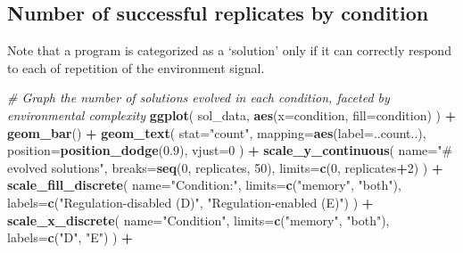\documentclass[
]{book}
\newenvironment{Shaded}{\begin{snugshade}}{\end{snugshade}}
\newcommand{\CommentTok}[1]{\textcolor[rgb]{0.56,0.35,0.01}{\textit{#1}}}
\newcommand{\DataTypeTok}[1]{\textcolor[rgb]{0.13,0.29,0.53}{#1}}
\newcommand{\DecValTok}[1]{\textcolor[rgb]{0.00,0.00,0.81}{#1}}
\newcommand{\FloatTok}[1]{\textcolor[rgb]{0.00,0.00,0.81}{#1}}
\newcommand{\KeywordTok}[1]{\textcolor[rgb]{0.13,0.29,0.53}{\textbf{#1}}}
\newcommand{\NormalTok}[1]{#1}
\newcommand{\OperatorTok}[1]{\textcolor[rgb]{0.81,0.36,0.00}{\textbf{#1}}}
\newcommand{\StringTok}[1]{\textcolor[rgb]{0.31,0.60,0.02}{#1}}
\begin{document}
\hypertarget{number-of-successful-replicates-by-condition}{%
\subsection{Number of successful replicates by condition}\label{number-of-successful-replicates-by-condition}}

Note that a program is categorized as a `solution' only if it can correctly respond to each of repetition of the environment signal.

\begin{Shaded}
\begin{Highlighting}[]
\CommentTok{\# Graph the number of solutions evolved in each condition, faceted by environmental complexity}
\KeywordTok{ggplot}\NormalTok{( sol\_data, }\KeywordTok{aes}\NormalTok{(}\DataTypeTok{x=}\NormalTok{condition, }\DataTypeTok{fill=}\NormalTok{condition) ) }\OperatorTok{+}
\StringTok{  }\KeywordTok{geom\_bar}\NormalTok{() }\OperatorTok{+}
\StringTok{  }\KeywordTok{geom\_text}\NormalTok{(}
    \DataTypeTok{stat=}\StringTok{"count"}\NormalTok{,}
    \DataTypeTok{mapping=}\KeywordTok{aes}\NormalTok{(}\DataTypeTok{label=}\NormalTok{..count..),}
    \DataTypeTok{position=}\KeywordTok{position\_dodge}\NormalTok{(}\FloatTok{0.9}\NormalTok{),}
    \DataTypeTok{vjust=}\DecValTok{0}
\NormalTok{  ) }\OperatorTok{+}
\StringTok{  }\KeywordTok{scale\_y\_continuous}\NormalTok{(}
    \DataTypeTok{name=}\StringTok{"\# evolved solutions"}\NormalTok{,}
    \DataTypeTok{breaks=}\KeywordTok{seq}\NormalTok{(}\DecValTok{0}\NormalTok{, replicates, }\DecValTok{50}\NormalTok{),}
    \DataTypeTok{limits=}\KeywordTok{c}\NormalTok{(}\DecValTok{0}\NormalTok{, replicates}\OperatorTok{+}\DecValTok{2}\NormalTok{)}
\NormalTok{  ) }\OperatorTok{+}
\StringTok{  }\KeywordTok{scale\_fill\_discrete}\NormalTok{(}
    \DataTypeTok{name=}\StringTok{"Condition:"}\NormalTok{,}
    \DataTypeTok{limits=}\KeywordTok{c}\NormalTok{(}\StringTok{"memory"}\NormalTok{, }\StringTok{"both"}\NormalTok{),}
    \DataTypeTok{labels=}\KeywordTok{c}\NormalTok{(}\StringTok{"Regulation{-}disabled (D)"}\NormalTok{, }\StringTok{"Regulation{-}enabled (E)"}\NormalTok{)}
\NormalTok{  ) }\OperatorTok{+}
\StringTok{  }\KeywordTok{scale\_x\_discrete}\NormalTok{(}
    \DataTypeTok{name=}\StringTok{"Condition"}\NormalTok{,}
    \DataTypeTok{limits=}\KeywordTok{c}\NormalTok{(}\StringTok{"memory"}\NormalTok{, }\StringTok{"both"}\NormalTok{),}
    \DataTypeTok{labels=}\KeywordTok{c}\NormalTok{(}\StringTok{"D"}\NormalTok{, }\StringTok{"E"}\NormalTok{)}
\NormalTok{  ) }\OperatorTok{+}

\end{Highlighting}
\end{Shaded}
\end{document}

